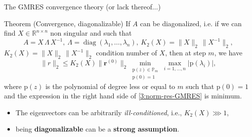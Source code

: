 \documentclass[aspectratio=169,xcolor=dvipsnames]{beamer}
\begin{document}
\begin{frame}{The GMRES convergence theory (or lack thereof$\ldots$)}

\begin{alertblock}{Theorem (Convergence, diagonalizable)}
If  $A$ can be diagonalized, i.e. if we can find $X\in \mathbb{R}^{n
	\times n}$ non singular and such that
$$
A=X\,\Lambda\,X^{-1}, \  \Lambda=\operatorname{diag}(\lambda_1,\ldots,\lambda_n), \
K_2(X)=\|X\|_2\,\|X^{-1}\|_2,
$$
$K_2(X)=\|X\|_2\,\|X^{-1}\|_2$ condition number of $X$, then at step
$m$, we have
\begin{equation}\tag{DiagGMRES}
	\|r\|_2\leq K_2(X) \|\mathbf{r}^{(0)}\|_2
	\min_{\substack{\mathrm{p}(z)\in\mathbb{P}_m\\\mathrm{p}(0)=1}} \max_{i=1,\ldots,n}
	|\mathrm{p}(\lambda_i)|, \label{3:norm-res-GMRES}
\end{equation}
where $\mathrm{p}(z)$ is the polynomial of degree less or equal to  $m$
such that $\mathrm{p}(0)=1$ and the expression in the right hand side
of \eqref{3:norm-res-GMRES} is minimum.
\end{alertblock}

\begin{itemize}
	\item[\faExclamationTriangle] The \alert{eigenvectors} can be \alert{arbitrarily \emph{ill-conditioned}}, i.e., $K_2(X) \ggg 1$,
	\item[\faExclamationCircle] being \textbf{diagonalizable} can be a \textbf{strong assumption}.
\end{itemize}

\end{frame}
\end{document}
